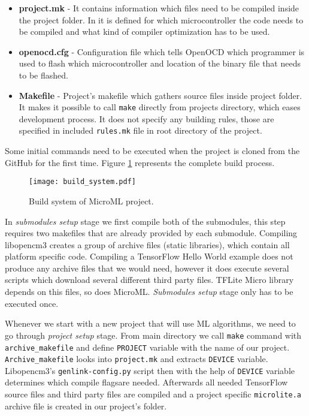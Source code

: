 \begin{itemize}
    \item \textbf{project.mk} - It contains information which files need to be compiled inside the project folder. In it is defined for which microcontroller the code needs to be compiled and what kind of compiler optimization has to be used.
    \item \textbf{openocd.cfg} - Configuration file which tells OpenOCD which programmer is used to flash which microcontroller and location of the binary file that needs to be flashed.
    \item \textbf{Makefile} - Project's makefile which gathers source files inside project folder. It makes it possible to call \verb|make| directly from projects directory, which eases development process. It does not specify any building rules, those are specified in included \verb|rules.mk| file in root directory of the project.
\end{itemize}

Some initial commands need to be executed when the project is cloned from the GitHub for the first time. 
Figure \ref{build_system} represents the complete build process.

\begin{figure}[ht]
        \centering
        \texttt{[image: build\_system.pdf]} 
        \caption{ Build system of MicroML project.} 
        \label{build_system}
\end{figure}

In \textit{submodules setup} stage we first compile both of the submodules, this step requires two makefiles that are already provided by each submodule.
Compiling libopencm3 creates a group of archive files (static libraries), which contain all platform specific code.
Compiling a TensorFlow Hello World example does not produce any archive files that we would need, however it does execute several scripts which download several different third party files.
TFLite Micro library depends on this files, so does MicroML.
\textit{Submodules setup} stage only has to be executed once.

Whenever we start with a new project that will use ML algorithms, we need to go through \textit{project setup} stage.
From main directory we call \verb|make| command with \verb|archive_makefile| and define \verb|PROJECT| variable with the name of our project.
\verb|Archive_makefile| looks into \verb|project.mk| and extracts \verb|DEVICE| variable.
Libopencm3's \verb|genlink-config.py| script then with the help of \verb|DEVICE| variable determines which compile flags\footnotemark are needed. 
Afterwards all needed TensorFlow source files and third party files are compiled and a project specific \verb|microlite.a| archive file is created in our project's folder.

